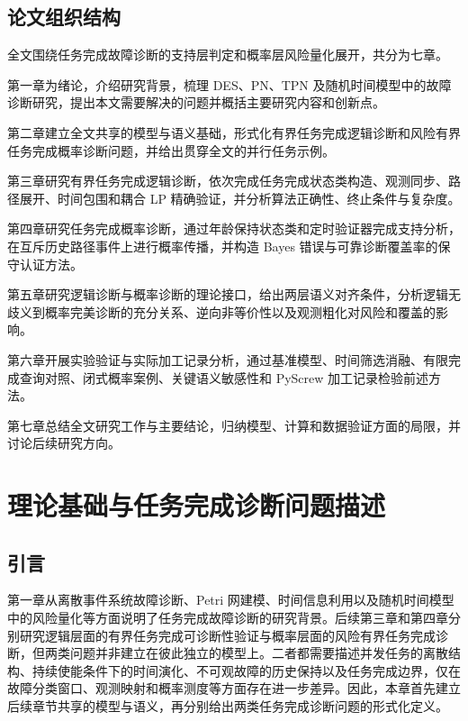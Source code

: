 \documentclass[master,fontset=ubuntu]{shnuthesis}
\theoremstyle{definition}
\begin{document}
\section{论文组织结构}

全文围绕任务完成故障诊断的支持层判定和概率层风险量化展开，共分为七章。

第一章为绪论，介绍研究背景，梳理 DES、PN、TPN 及随机时间模型中的故障诊断研究，提出本文需要解决的问题并概括主要研究内容和创新点。

第二章建立全文共享的模型与语义基础，形式化有界任务完成逻辑诊断和风险有界任务完成概率诊断问题，并给出贯穿全文的并行任务示例。

第三章研究有界任务完成逻辑诊断，依次完成任务完成状态类构造、观测同步、路径展开、时间包围和耦合 LP 精确验证，并分析算法正确性、终止条件与复杂度。

第四章研究任务完成概率诊断，通过年龄保持状态类和定时验证器完成支持分析，在互斥历史路径事件上进行概率传播，并构造 Bayes 错误与可靠诊断覆盖率的保守认证方法。

第五章研究逻辑诊断与概率诊断的理论接口，给出两层语义对齐条件，分析逻辑无歧义到概率完美诊断的充分关系、逆向非等价性以及观测粗化对风险和覆盖的影响。

第六章开展实验验证与实际加工记录分析，通过基准模型、时间筛选消融、有限完成查询对照、闭式概率案例、关键语义敏感性和 PyScrew 加工记录检验前述方法。

第七章总结全文研究工作与主要结论，归纳模型、计算和数据验证方面的局限，并讨论后续研究方向。

\chapter{理论基础与任务完成诊断问题描述}

\section{引言}

第一章从离散事件系统故障诊断、Petri 网建模、时间信息利用以及随机时间模型中的风险量化等方面说明了任务完成故障诊断的研究背景。后续第三章和第四章分别研究逻辑层面的有界任务完成可诊断性验证与概率层面的风险有界任务完成诊断，但两类问题并非建立在彼此独立的模型上。二者都需要描述并发任务的离散结构、持续使能条件下的时间演化、不可观故障的历史保持以及任务完成边界，仅在故障分类窗口、观测映射和概率测度等方面存在进一步差异。因此，本章首先建立后续章节共享的模型与语义，再分别给出两类任务完成诊断问题的形式化定义。
\end{document}

